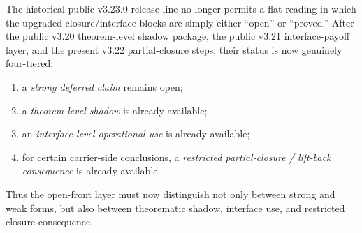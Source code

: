 \begin{remark}
\label{rem:v322-synchronized-status-reading-upgraded-closure-layer}
The historical public v3.23.0 release line no longer permits a flat reading in which the upgraded closure/interface blocks are simply either ``open'' or ``proved.'' After the public v3.20 theorem-level shadow package, the public v3.21 interface-payoff layer, and the present v3.22 partial-closure steps, their status is now genuinely four-tiered:
\begin{enumerate}[leftmargin=2em,label=(\roman*)]
  \item a \emph{strong deferred claim} remains open;
  \item a \emph{theorem-level shadow} is already available;
  \item an \emph{interface-level operational use} is already available;
  \item for certain carrier-side conclusions, a \emph{restricted partial-closure / lift-back consequence} is already available.
\end{enumerate}
Thus the open-front layer must now distinguish not only between strong and weak forms, but also between theorematic shadow, interface use, and restricted closure consequence.
\end{remark}

